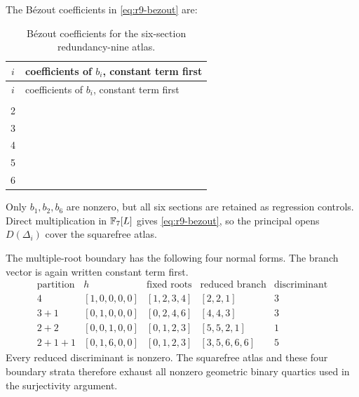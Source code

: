 The B\'ezout coefficients in \eqref{eq:r9-bezout} are:
\pagebreak[4]
\begin{longtable}{c p{}}
\caption{B\'ezout coefficients for the six-section redundancy-nine atlas.}
\label{tab:r9-bezout-coefficients}\\
\toprule
$i$ & coefficients of $b_i$, constant term first\\
\midrule
\endfirsthead
\toprule
$i$ & coefficients of $b_i$, constant term first\\
\midrule
\endhead
\bottomrule
\endfoot
1 & \ttfamily[6, 4, 1, 2, 3, 5, 5, 1, 6, 5, 0, 0, 4, 5, 3, 6, 2, 1, 1, 4, 3, 1, 2, 6, 4, 2, 6, 4, 6, 3, 0, 5, 5, 2, 6]\\
2 & \ttfamily[1, 0, 5, 1, 1, 5, 4, 2, 6, 5, 0, 4, 6, 4, 4, 4, 1, 3, 0, 1, 3, 3, 5, 1, 6, 4, 3, 6, 5, 0, 2, 4, 4, 5, 2]\\
3 & \ttfamily[]\\
4 & \ttfamily[]\\
5 & \ttfamily[]\\
6 & \ttfamily[0, 3, 5, 4, 0, 1]\\
\end{longtable}
\endgroup

Only $b_1,b_2,b_6$ are nonzero, but all six sections are retained as
regression controls.  Direct multiplication in $\mathbb F_7[L]$ gives
\eqref{eq:r9-bezout}, so the principal opens $D(\Delta_i)$ cover the
squarefree atlas.

The multiple-root boundary has the following four
normal forms.  The branch vector is again written constant term first.
\[
\begin{array}{c|c|c|c|c}
\text{partition}&h&\text{fixed roots}&\text{reduced branch}&
\text{discriminant}\\ \hline
4 &[1,0,0,0,0]&[1,2,3,4]&[2,2,1]&3\\
3+1 &[0,1,0,0,0]&[0,2,4,6]&[4,4,3]&3\\
2+2 &[0,0,1,0,0]&[0,1,2,3]&[5,5,2,1]&1\\
2+1+1 &[0,1,6,0,0]&[0,1,2,3]&[3,5,6,6,6]&5
\end{array}
\]
Every reduced discriminant is nonzero.  The squarefree atlas and
these four boundary strata therefore exhaust all nonzero geometric
binary quartics used in the surjectivity argument.
